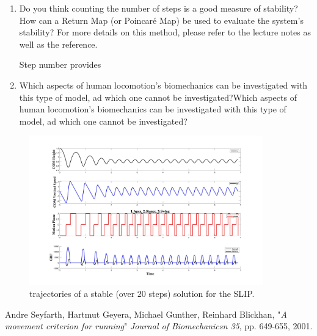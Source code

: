 \documentclass[11pt]{article}
\begin{document}
\begin{enumerate}
    \item Do you think counting the number of steps is a good measure of stability? How can a Return Map (or Poincaré Map) be used to evaluate the system's stability? For more details on this method, please refer to the lecture notes as well as the reference.
    \begin{adjustwidth}{0.5cm}{}
        Step number provides 
    \end{adjustwidth}

    \item Which aspects of human locomotion's biomechanics can be investigated with this type of model, ad which one cannot be investigated?Which aspects of human locomotion's biomechanics can be investigated with this type of model, ad which one cannot be investigated?
    \begin{adjustwidth}{0.5cm}{}
        
    \end{adjustwidth}
\end{enumerate}

\begin{figure}[h!]
    \centering
    \includegraphics[width=0.9\textwidth]{screens/run_1.jpg}
    \caption{trajectories of a stable (over $20$ steps) solution for the SLIP.}
\end{figure}

\begin{thebibliography}{1}

     Andre Seyfarth, Hartmut Geyera, Michael Gunther, Reinhard Blickhan, "\textit{A movement criterion for running}" \emph{Journal of Biomechanicsn 35}, pp. 649-655, 2001.

\end{thebibliography}
\end{document}
